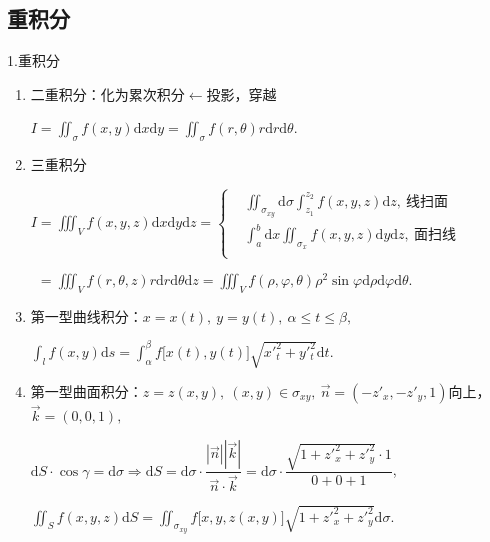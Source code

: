 \documentclass[UTF8]{ctexart}
\newcommand\dif{\mathrm{d}}
\newcommand\no{\noindent}
\newcommand\dis{\displaystyle}
\newcommand\ls{\leqslant}
\newcommand\intd{\dis\int}
\begin{document}
\begin{spacing}{2}
\subsection{重积分}

\no1.重积分

\begin{enumerate}[itemindent=1.4em, label=(\arabic*)]

\item 二重积分：化为累次积分$\longleftarrow$投影，穿越

\centerline{$I=\dis\iint_\sigma f(x,y)\dif x\dif y=\iint_\sigma f(r,\theta)r\dif r\dif\theta$.}

\item 三重积分

$I=\dis\iiint_Vf(x,y,z)\dif x\dif y\dif z
=\left\{\begin{aligned}
&\iint_{\sigma_{xy}}\dif\sigma\intd_{z_1}^{z_2}f(x,y,z)\dif z,\ \text{线扫面}\\
&\int_a^b\dif x\iint_{\sigma_x}f(x,y,z)\dif y\dif z,\ \text{面扫线}\\
\end{aligned}\right.$

\vspace{0.3cm}

$\ \ =\dis\iiint_Vf(r,\theta,z)r\dif r\dif \theta\dif z
=\dis\iiint_Vf(\rho,\varphi,\theta)\rho^2\sin\varphi\dif \rho\dif \varphi\dif \theta.$

\item 第一型曲线积分：$x=x(t),\ y=y(t),\ \alpha\ls t\ls\beta,$

\centerline{$\intd_l f(x,y)\dif s
=\intd_\alpha^\beta f\big[x(t),y(t)\big]\sqrt{x'^2_t+y'^2_t}\dif t.$}

\item 第一型曲面积分：$z=z(x,y),\ (x,y)\in\sigma_{xy},\ \stackrel{\rightarrow}{n}
=\left(-z'_x,-z'_y,1\right)$向上，$\stackrel{\rightarrow}{k}=(0,0,1),$

\textcolor[rgb]{1,0,0}{$\dis\dif S\cdot\cos\gamma=\dif\sigma\Longrightarrow\dif 
S=\dif\sigma\cdot
\dfrac{\left|\stackrel{\rightarrow}{n}\right|\left|\stackrel{\rightarrow}{k}\right|}
{\stackrel{\rightarrow}{n}\cdot\stackrel{\rightarrow}{k}}
=\dif\sigma\cdot\dfrac{\dis\sqrt{1+z'^2_x+z'^2_y}\cdot1}{0+0+1}$},

\vspace{0.2cm}

\centerline{$\dis\iint_Sf(x,y,z)\dif S=\iint_{\sigma_{xy}}f\big[x,y,z(x,y)\big]
\sqrt{1+z'^2_x+z'^2_y}\dif\sigma.$}


\end{enumerate}
\end{spacing}
\end{document}
